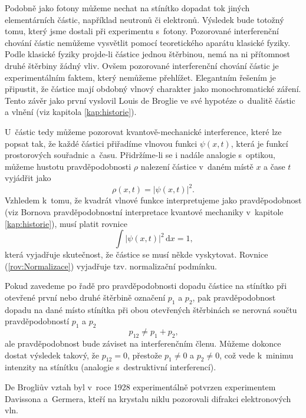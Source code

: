 Podobně jako fotony můžeme nechat na stínítko dopadat tok jiných elementárních částic, například neutronů či elektronů. Výsledek bude totožný tomu, který jsme dostali při experimentu s~fotony. Pozorované interferenční chování částic nemůžeme vysvětlit pomocí teoretického aparátu klasické fyziky. Podle klasické fyziky projde-li částice jednou štěrbinou, nemá na ni přítomnost druhé štěrbiny žádný vliv. Ovšem pozorované interferenční chování částic je experimentálním faktem, který nemůžeme přehlížet. Elegantním řešením je připustit, že částice mají obdobný vlnový charakter jako monochromatické záření. Tento závěr jako první vyslovil Louis de Broglie ve své hypotéze o~dualitě částic a vlnění (viz kapitola \ref{kap:historie}).

U~částic tedy můžeme pozorovat kvantově-mechanické interference, které lze popsat tak, že každé částici přiřadíme vlnovou funkci $\psi(x, t)$, která je funkcí prostorových souřadnic a~času. Přidržíme-li se i nadále analogie s~optikou, můžeme hustotu pravděpodobnosti $\rho$ nalezení částice v~daném místě $x$ a čase $t$ vyjádřit jako
\begin{equation}
\rho(x, t) = |\psi(x,t)|^2 \mbox{.}
\label{rov:VlnovaFce-castice}
\end{equation}
Vzhledem k~tomu, že kvadrát vlnové funkce interpretujeme jako pravděpodobnost (viz Bornova pravděpodobnostní interpretace kvantové mechaniky v~kapitole \ref{kap:historie}), musí platit rovnice
\begin{equation}
\int |\psi(x,t)|^2 \,\mathrm{d}x = 1 \mbox{,}
\label{rov:Normalizace}
\end{equation}
která vyjadřuje skutečnost, že částice se musí někde vyskytovat. Rovnice (\ref{rov:Normalizace}) vyjadřuje tzv. normalizační podmínku.

Pokud zavedeme po řadě pro pravděpodobnosti dopadu částice na stínítko při otevřené první nebo druhé štěrbině označení $p_1$ a $p_2$, pak pravděpodobnost dopadu na dané místo stínítka při obou otevřených štěrbinách se nerovná součtu pravděpodobností $p_1$ a $p_2$
\begin{equation}
p_{12} \not = p_1 + p_2 \mbox{,}
\label{rov:Pravdepodobnosti-Stinitko}
\end{equation}
ale pravděpodobnost bude záviset na interferenčním členu. Můžeme dokonce dostat výsledek takový, že $p_{12} = 0$, přestože $p_1 \not =  0$ a $p_2 \not = 0$, což vede k~minimu intenzity na stínítku (analogie s~destruktivní interferencí).

De Brogliův vztah byl v~roce 1928 experimentálně potvrzen experimentem Davissona a~Germera, kteří na krystalu niklu pozorovali difrakci elektronových vln.

